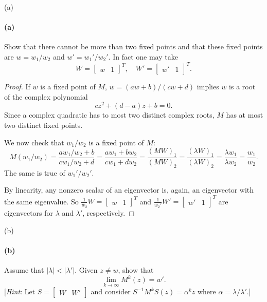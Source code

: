 \documentclass[12pt]{article}
\newlength{\myparskip}
\newenvironment{fullbox}{\begin{lrbox}{\savefullbox}\begin{minipage}{\dimexpr\textwidth-2\fboxsep\relax}\setlength{\parskip}{\myparskip}}{\end{minipage}\end{lrbox}\framebox[\textwidth]{\usebox{\savefullbox}}}
\newenvironment{pbox}[1][]{\begin{fullbox}\ifx#1\empty\else\paragraph{#1}\fi}{\end{fullbox}}
\newcommand{\<}{\langle}
\renewcommand{\>}{\rangle}
\newcommand{\mat}[1]{\begin{bmatrix}#1\end{bmatrix}}
\begin{document}
\begin{pbox}[(a)]
    Show that there cannot be more than two fixed points and that these fixed points are $w = w_1/w_2$ and $w' = w_1'/w_2'$. In fact one may take
    \[
        W = \mat{w & 1}^T, \quad W' = \mat{w' & 1}^T.
    \]
\end{pbox}

\begin{proof}
    If $w$ is a fixed point of $M$, $w = (aw + b)/(cw + d)$ implies $w$ is a root of the complex polynomial
    \[
        cz^2 + (d - a)z + b = 0.
    \]
    Since a complex quadratic has to most two distinct complex roots, $M$ has at most two distinct fixed points.

    We now check that $w_1/w_2$ is a fixed point of $M$:
    \[
        M(w_1/w_2)
            = \frac{aw_1/w_2 + b}{cw_1/w_2 + d}
            = \frac{aw_1 + bw_2}{cw_1 + dw_2}
            = \frac{(MW)_1}{(MW)_2}
            = \frac{(\lambda W)_1}{(\lambda W)_2}
            = \frac{\lambda w_1}{\lambda w_2}
            = \frac{w_1}{w_2}.
    \]
    The same is true of $w_1'/w_2'$.

    By linearity, any nonzero scalar of an eigenvector is, again, an eigenvector with the same eigenvalue. So $\frac{1}{w_2}W = \mat{w & 1}^T$ and $\frac{1}{w_2'}W' = \mat{w' & 1}^T$ are eigenvectors for $\lambda$ and $\lambda'$, respectively.

\end{proof}

\newpage
\begin{pbox}[(b)]
    Assume that $|\lambda| < |\lambda'|$. Given $z \ne w$, show that
    \[
        \lim_{k \to \infty} M^k(z) = w'.
    \]
    [\textit{Hint}: Let $S = \mat{W & W'}$ and consider $S^{-1}M^kS(z) = \alpha^kz$ where $\alpha = \lambda/\lambda'$.]
\end{pbox}
\end{document}
